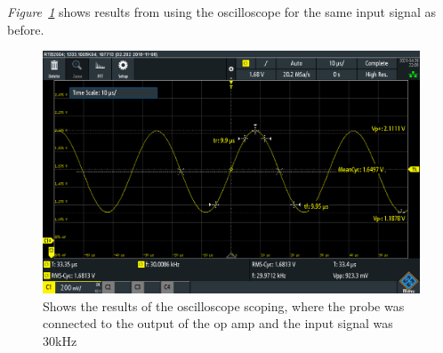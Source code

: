  \textit{Figure~\ref{fig:Oscillo30k300k}} shows results from using the oscilloscope for the same input signal as before.
 
\begin{figure}[h]
    \centering
    \includegraphics[width=1.0\textwidth]{graphics/30k10mvPP300ksamp.PNG}
    \caption{Shows the results of the oscilloscope scoping, where the probe was connected to the output of the op amp and the input signal was 30kHz}
    \label{fig:Oscillo30k300k}
\end{figure}








